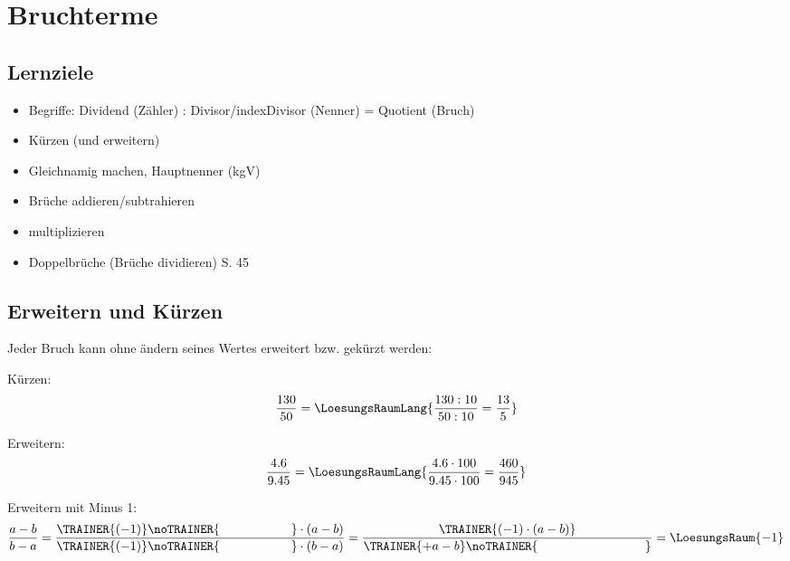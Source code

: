 \newpage
\section{Bruchterme}\label{bruchterme}

\subsection*{Lernziele}

\begin{itemize}
	\item Begriffe: Dividend (Zähler) :
  Divisor/index{Divisor} (Nenner) = Quotient (Bruch)
  \item Kürzen (und erweitern)
	\item Gleichnamig machen, Hauptnenner (kgV)
	\item Brüche addieren/subtrahieren
  \item multiplizieren
	\item Doppelbrüche (Brüche dividieren) S. 45 \cite{marthaler21alg}
\end{itemize}


\newpage

\subsection{Erweitern und Kürzen}

Jeder Bruch kann ohne ändern seines Wertes erweitert bzw. gekürzt
werden:

Kürzen:
$$\frac{130}{50} = \LoesungsRaumLang{\frac{130 : 10}{50:10} =\frac{13}{5}}$$

Erweitern:
$$\frac{4.6}{9.45} = \LoesungsRaumLang{\frac{4.6 \cdot{}100}{9.45\cdot{}100} =
\frac{460}{945}}$$

Erweitern mit Minus 1:
$$\frac{a-b}{b-a} = \frac{\TRAINER{(-1)}\noTRAINER{\hspace{20mm}}\cdot(a-b)}{\TRAINER{(-1)}\noTRAINER{\hspace{20mm}}\cdot(b-a)}
= \frac{\TRAINER{(-1)\cdot(a-b)}}{\TRAINER{+a-b}\noTRAINER{\hspace{30mm}}} = \LoesungsRaum{-1}$$

